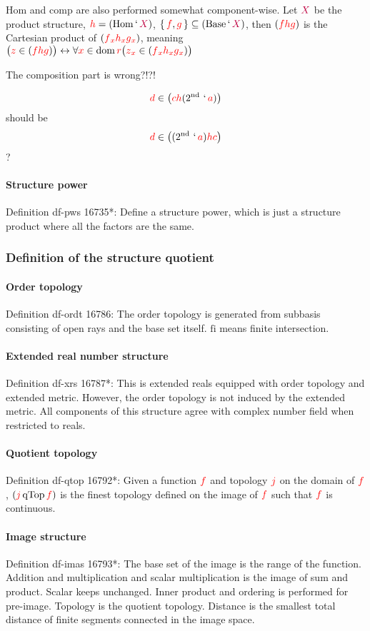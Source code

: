 \documentclass[12pt, letterpaper]{article}
\newcommand{\Hom}{\mathrm{Hom}}
\newcommand{\Base}{\mathrm{Base}}
\newcommand{\red}[1]{{\color{red} #1}}
\newcommand{\purple}[1]{{\color{purple} #1}}
\newcommand{\lra}{\leftrightarrow}
\newcommand{\setvar}{\red}
\newcommand{\classvar}{\purple}
\newcommand{\sa}{\setvar{a}}
\newcommand{\scc}{\setvar{c}}
\newcommand{\sd}{\setvar{d}}
\newcommand{\sff}{\setvar{f}}
\newcommand{\sg}{\setvar{g}}
\newcommand{\sh}{\setvar{h}}
\newcommand{\sj}{\setvar{j}}
\newcommand{\sr}{\setvar{r}}
\newcommand{\sx}{\setvar{x}}
\newcommand{\sz}{\setvar{z}}
\newcommand{\clX}{\classvar{X}}
\newcommand{\at}{\,`\,}
\newcommand{\dom}{{\operatorname{dom}\,}}
\newcommand{\snd}{\operatorname{2^{nd}}}
\theoremstyle{definition}
\theoremstyle{remark}
\theoremstyle{definition}
\theoremstyle{plain}
\begin{document}
	Hom and comp are also performed somewhat component-wise. Let $\clX$ be the product structure, $\sh=(\Hom\at\clX)$, $\set{\sff,\sg}\subseteq(\Base\at\clX)$, then $(\sff\sh\sg)$ is the Cartesian product of $(\sff_\sx\sh_\sx\sg_\sx)$, meaning $\big(\sz\in(\sff\sh\sg)\big)\lra\forall\sx\in\dom\sr\big(\sz_\sx\in(\sff_\sx\sh_\sx\sg_\sx)\big)$
	
	\red{The composition part is wrong?!?!}
	
	\[\sd \in \big(\scc\sh(\snd\at\sa)\big)\]
	should be
	\[\sd \in \big((\snd\at\sa)\sh\scc\big)\]
	?
	
	\paragraph{Structure power}
	Definition	df-pws 16735*:	Define a structure power, which is just a structure product where all the factors are the same.
	
	\subsubsection{Definition of the structure quotient}
	
	\paragraph{Order topology}
	Definition df-ordt 16786:
	The order topology is generated from subbasis consisting of open rays and the base set itself.
	$\mathrm{fi}$ means finite intersection.
	
	\paragraph{Extended real number structure}
	Definition	df-xrs 16787*: This is extended reals equipped with order topology and extended metric. However, the order topology is not induced by the extended metric. All components of this structure agree with complex number field when restricted to reals.
	
	\paragraph{Quotient topology}
	Definition	df-qtop 16792*: Given a function $\sff$ and topology $\sj$ on the domain of $\sff$, $(\sj\,\mathrm{qTop}\,\sff)$ is the finest topology defined on the image of $\sff$ such that $\sff$ is continuous.
	
	\paragraph{Image structure}
	Definition	df-imas 16793*:
	The base set of the image is the range of the function.
	Addition and multiplication and scalar multiplication is the image of sum and product.
	Scalar keeps unchanged. Inner product and ordering is performed for pre-image.
	Topology is the quotient topology.
	Distance is the smallest total distance of finite segments connected in the image space.
	
\end{document}
